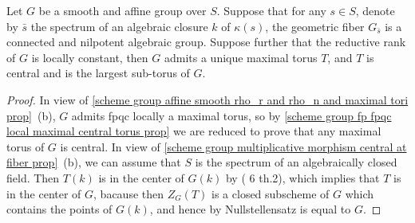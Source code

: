 \begin{corollary}\label{scheme group affine smooth rho_r constant maximal torus if fiber nilpotent}
Let $G$ be a smooth and affine group over $S$. Suppose that for any $s\in S$, denote by $\bar{s}$ the spectrum of an algebraic closure $k$ of $\kappa(s)$, the geometric fiber $G_{\bar{s}}$ is a connected and nilpotent algebraic group. Suppose further that the reductive rank of $G$ is locally constant, then $G$ admits a unique maximal torus $T$, and $T$ is central and is the largest sub-torus of $G$.
\end{corollary}
\begin{proof}
In view of \cref{scheme group affine smooth rho_r and rho_n and maximal tori prop}~(b), $G$ admits fpqc locally a maximal torus, so by \cref{scheme group fp fpqc local maximal central torus prop} we are reduced to prove that any maximal torus of $G$ is central. In view of \cref{scheme group multiplicative morphism central at fiber prop}~(b), we can assume that $S$ is the spectrum of an algebraically closed field. Then $T(k)$ is in the center of $G(k)$ by (\cite{Chevalley1958} 6 th.2), which implies that $T$ is in the center of $G$, bacause then $Z_G(T)$ is a closed subscheme of $G$ which contains the points of $G(k)$, and hence by Nullstellensatz is equal to $G$.
\end{proof}


